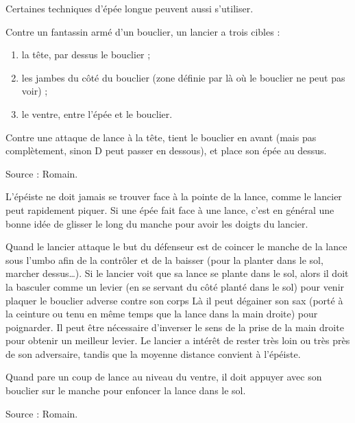 Certaines techniques d'épée longue peuvent aussi s'utiliser.

Contre un fantassin armé d'un bouclier, un lancier a trois cibles :
\begin{enumerate}
	\item la tête, par dessus le bouclier ;
	\item les jambes du côté du bouclier (zone définie par là où le bouclier ne peut pas voir) ;
	\item le ventre, entre l'épée et le bouclier.
\end{enumerate}


\begin{garde}
Contre une attaque de lance à la tête, \D tient le bouclier en avant (mais pas complètement, sinon D peut passer en dessous), et place son épée au dessus.

Source : Romain.
\end{garde}


L'épéiste ne doit jamais se trouver face à la pointe de la lance, comme le lancier peut rapidement piquer.
Si une épée fait face à une lance, c'est en général une bonne idée de glisser le long du manche pour avoir les doigts du lancier.

Quand le lancier attaque le but du défenseur est de coincer le manche de la lance sous l'umbo afin de la contrôler et de la baisser (pour la planter dans le sol, marcher dessus…).
Si le lancier voit que sa lance se plante dans le sol, alors il doit la basculer comme un levier (en se servant du côté planté dans le sol) pour venir plaquer le bouclier adverse contre son corps
Là il peut dégainer son sax (porté à la ceinture ou tenu en même temps que la lance dans la main droite) pour poignarder.
Il peut être nécessaire d'inverser le sens de la prise de la main droite pour obtenir un meilleur levier.
Le lancier a intérêt de rester très loin ou très près de son adversaire, tandis que la moyenne distance convient à l'épéiste.


\begin{technique}
Quand \D pare un coup de lance au niveau du ventre, il doit appuyer avec son bouclier sur le manche pour enfoncer la lance dans le sol.

Source : Romain.
\end{technique}


